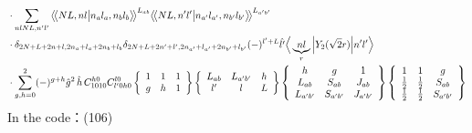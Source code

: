 \documentclass[master]{shnuthesis}
\newcommand{\llangle}{\big\langle\!\big\langle}
\newcommand{\rrangle}{\big\rangle\!\big\rangle}
\newcommand{\ap}{a^\prime}
\newcommand{\bp}{b^\prime}
\begin{document}
\begin{align}
    & \cdot \sum_{nlNL,n^\prime l^\prime} \llangle N L, n l \big| n_{a} l_{a}, n_{b} l_{b} \rrangle^{L_{ab}} \llangle N L, n^\prime l^\prime \big| n_{a^\prime} l_{a^\prime}, n_{b^\prime} l_{b^\prime} \rrangle^{L_{\ap\bp}} \notag\\
    & \cdot \delta_{2N+L+2n+l,2n_a+l_a+2n_b+l_b}\delta_{2N+L+2n^\prime+l^\prime,2n_{a^\prime}+l_{a^\prime}+2n_{b^\prime}+l_{b^\prime}} (-)^{l^\prime+L}\hat{l^\prime}\Big\langle \underbrace{n l}_{r} \Big| Y_2(\sqrt{2}r) \Big| n^\prime l^\prime \Big\rangle \notag\\
    & \cdot \sum_{g,h=0}^2 (-)^{g+h} \hat{g}^2\,\hat{h}\,  C_{1010}^{h0}C_{l^\prime 0 h 0}^{l0}  \left\{\begin{array}{ccc} 1 & 1 & 1 \\ g & h & 1 \end{array}\right\}  \left\{\begin{array}{ccc} L_{ab} & L_{\ap\bp} & h \\ l^\prime & l & L \end{array}\right\}  \left\{\begin{array}{ccc} h & g & 1 \\ L_{ab} & S_{ab} & J_{ab} \\ L_{\ap\bp} & S_{\ap\bp} & J_{\ap\bp} \end{array}\right\}  \left\{\begin{array}{ccc} 1 & 1 & g \\ \frac{1}{2} & \frac{1}{2} & S_{ab} \\ \frac{1}{2} & \frac{1}{2} & S_{\ap\bp} \end{array}\right\}  
\end{align}
In the code：(106)
\end{document}
